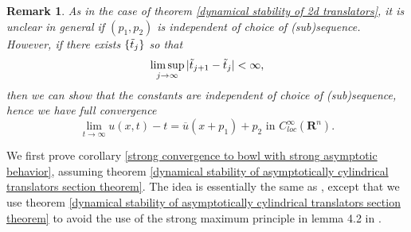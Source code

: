 \documentclass[pdflatex,sn-mathphys-num]{sn-jnl}%
\newtheorem{remark}[theorem]{Remark}
\begin{document}
\begin{remark}\label{independence of constants to subsequence cylindrical remark}
As in the case of theorem \ref{dynamical stability of 2d translators}, it is unclear in general if $(p_1, p_2)$ is independent of choice of (sub)sequence. However, if there exists $\{\Tilde{t}_j\}$ so that
\begin{equation}
    \limsup_{j \to \infty}|\Tilde{t}_{j+1} - \Tilde{t}_j| < \infty,
\end{equation}
then we can show that the constants are independent of choice of (sub)sequence, hence we have full convergence
\begin{equation}
    \lim_{t \to \infty}u(x,t) - t = \overline{u}(x + p_1) + p_2 \text{ in }C^{\infty}_{loc}(\mathbf{R}^n).
\end{equation}
\end{remark}
We first prove corollary \ref{strong convergence to bowl with strong asymptotic behavior}, assuming theorem \ref{dynamical stability of asymptotically cylindrical translators section theorem}. The idea is essentially the same as \cite{bowlstability}, except that we use theorem \ref{dynamical stability of asymptotically cylindrical translators section theorem} to avoid the use of the strong maximum principle in lemma 4.2 in \cite{bowlstability}.
\end{document}
